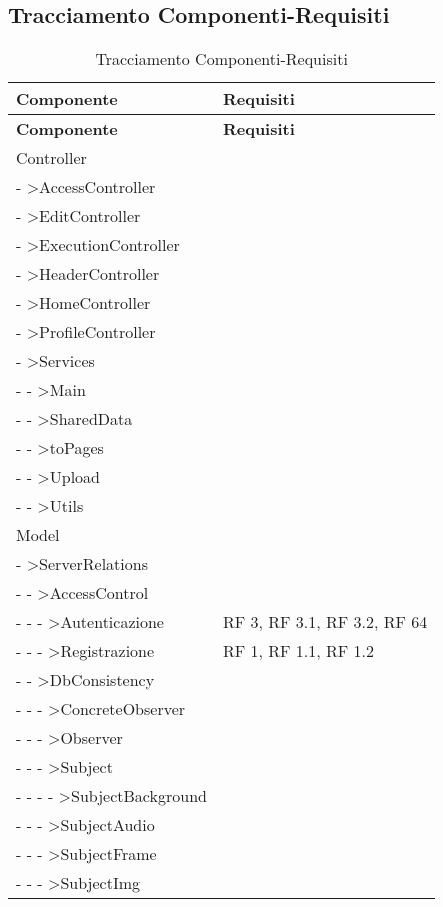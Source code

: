 \subsection{Tracciamento Componenti-Requisiti}{ 
\renewcommand*{\arraystretch}{1.4} 
\begin{longtable} [c]{| p{8cm} | p{5cm} |} 
\caption{Tracciamento Componenti-Requisiti \label{tab:traccCompReq}}\\ \hline\textbf{Componente} & \textbf{Requisiti} \\ 
\hline \endfirsthead \hline 
\textbf{Componente} & \textbf{Requisiti} \\ 
\hline \endhead \hline \endfoot \hline \endlastfoot 
Controller & \\ 
 \hline 
- >AccessController & \\ 
 \hline 
- >EditController & \\ 
 \hline 
- >ExecutionController & \\ 
 \hline 
- >HeaderController & \\ 
 \hline 
- >HomeController & \\ 
 \hline 
- >ProfileController & \\ 
 \hline 
- >Services & \\ 
 \hline 
- - >Main & \\ 
 \hline 
- - >SharedData & \\ 
 \hline 
- - >toPages & \\ 
 \hline 
- - >Upload & \\ 
 \hline 
- - >Utils & \\ 
 \hline 
Model & \\ 
 \hline 
- >ServerRelations & \\ 
 \hline 
- - >AccessControl & \\ 
 \hline 
- - - >Autenticazione & RF 3, RF 3.1, RF 3.2, RF 64\\ 
 \hline 
- - - >Registrazione & RF 1, RF 1.1, RF 1.2\\ 
 \hline 
- - >DbConsistency & \\ 
 \hline 
- - - >ConcreteObserver & \\ 
 \hline 
- - - >Observer & \\ 
 \hline 
- - - >Subject & \\ 
 \hline 
- - - - >SubjectBackground & \\ 
 \hline 
- - - >SubjectAudio & \\ 
 \hline 
- - - >SubjectFrame & \\ 
 \hline 
- - - >SubjectImg & \\ 

\end{longtable}}
